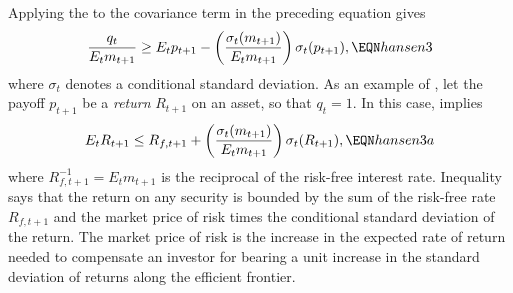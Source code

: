Applying the 
 to the covariance term in the preceding equation
gives
$${q_t \over E_t m_{t+1} } \geq
    E_t p_{t+1} -
\left({\sigma_t (m_{t+1}) \over E_t m_{t+1} }\right)
 \sigma_t (p_{t+1}) ,
      \EQN hansen3  $$
where $\sigma_t$ denotes a conditional standard deviation. %
As an example of , let the payoff $p_{t+1}$ be a {\it return} $R_{t+1}$ on an asset, so that
$q_t = 1$.  In this case,  implies
$$ E_t R_{t+1} \leq R_{f,t+1} + \left({\sigma_t (m_{t+1}) \over E_t m_{t+1} }\right) \sigma_t(R_{t+1}) ,   \EQN hansen3a $$
where $R_{f,t+1}^{-1} = E_t m_{t+1}$ is the reciprocal of the risk-free interest rate.
Inequality  says that  the return on any security is bounded by the sum of the risk-free rate $R_{f,t+1}$ and
the market price of risk times the conditional standard deviation of the return.
The market price of risk %
is the
increase in the expected rate of return needed to compensate an
investor for bearing a unit increase in the standard deviation of returns
along the efficient frontier.%



